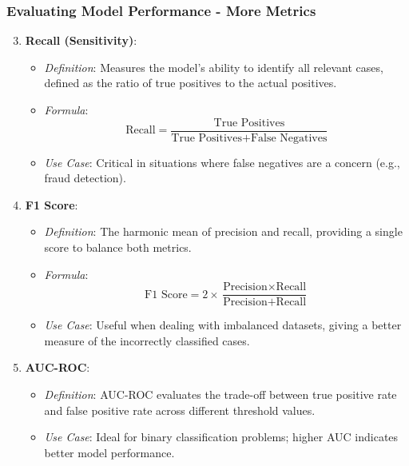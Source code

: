 \documentclass[aspectratio=169]{beamer}
\begin{document}
\begin{frame}[fragile]
    \frametitle{Evaluating Model Performance - More Metrics}
    \begin{enumerate}
        \setcounter{enumi}{2}
        \item \textbf{Recall (Sensitivity)}:
        \begin{itemize}
            \item \textit{Definition}: Measures the model’s ability to identify all relevant cases, defined as the ratio of true positives to the actual positives.
            \item \textit{Formula}:
            \[
            \text{Recall} = \frac{\text{True Positives}}{\text{True Positives} + \text{False Negatives}}
            \]
            \item \textit{Use Case}: Critical in situations where false negatives are a concern (e.g., fraud detection).
        \end{itemize}

        \item \textbf{F1 Score}:
        \begin{itemize}
            \item \textit{Definition}: The harmonic mean of precision and recall, providing a single score to balance both metrics.
            \item \textit{Formula}:
            \[
            \text{F1 Score} = 2 \times \frac{\text{Precision} \times \text{Recall}}{\text{Precision} + \text{Recall}}
            \]
            \item \textit{Use Case}: Useful when dealing with imbalanced datasets, giving a better measure of the incorrectly classified cases.
        \end{itemize}

        \item \textbf{AUC-ROC}:
        \begin{itemize}
            \item \textit{Definition}: AUC-ROC evaluates the trade-off between true positive rate and false positive rate across different threshold values.
            \item \textit{Use Case}: Ideal for binary classification problems; higher AUC indicates better model performance.
        \end{itemize}
    \end{enumerate}
\end{frame}
\end{document}
